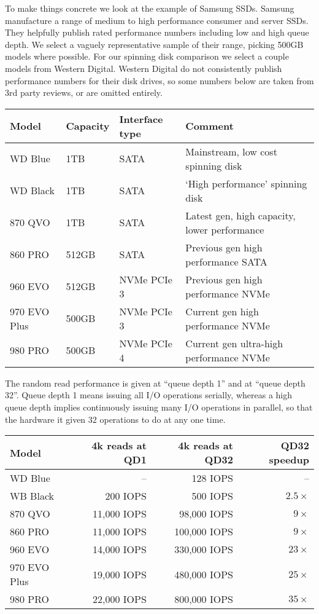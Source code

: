 \documentclass[11pt,a4paper]{article}
\begin{document}
To make things concrete we look at the example of Samsung SSDs. Samsung
manufacture a range of medium to high performance consumer and server SSDs. They
helpfully publish rated performance numbers including low and high queue depth.
We select a vaguely representative sample of their range, picking 500GB models
where possible. For our spinning disk comparison we select a couple models from
Western Digital. Western Digital do not consistently publish performance numbers
for their disk drives, so some numbers below are taken from 3rd party reviews,
or are omitted entirely.
\begin{center}
\begin{tabular}[]{llll}
  Model & Capacity & Interface type & Comment \\
  \toprule
  WD Blue      & 1TB   & SATA        & Mainstream, low cost spinning disk \\
  WD Black     & 1TB   & SATA        & `High performance' spinning disk  \\
  \midrule
  870 QVO      & 1TB   & SATA        & Latest gen, high capacity, lower performance \\
  860 PRO      & 512GB & SATA        & Previous gen high performance SATA \\
  960 EVO      & 512GB & NVMe PCIe 3 & Previous gen high performance NVMe \\
  970 EVO Plus & 500GB & NVMe PCIe 3 & Current gen high performance NVMe \\
  980 PRO      & 500GB & NVMe PCIe 4 & Current gen ultra-high performance NVMe
\end{tabular}
\end{center}
The random read performance is given at ``queue depth 1'' and at ``queue depth
32''. Queue depth 1 means issuing all I/O operations serially, whereas a high
queue depth implies continuously issuing many I/O operations in parallel, so
that the hardware it given 32 operations to do at any one time.
\begin{center}
\begin{tabular}[]{lrrr}
  Model & 4k reads at QD1 & 4k reads at QD32 & QD32 speedup \\
  \toprule
  WD Blue      &    --       &     128 IOPS & -- \\
  WB Black     &    200 IOPS &     500 IOPS & $2.5\times$ \\
  \midrule
  870 QVO      & 11,000 IOPS &  98,000 IOPS & $9\times$ \\
  860 PRO      & 11,000 IOPS & 100,000 IOPS & $9\times$ \\
  960 EVO      & 14,000 IOPS & 330,000 IOPS & $23\times$ \\
  970 EVO Plus & 19,000 IOPS & 480,000 IOPS & $25\times$ \\
  980 PRO      & 22,000 IOPS & 800,000 IOPS & $35\times$
\end{tabular}
\end{center}
\end{document}
